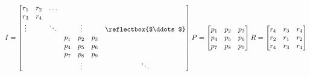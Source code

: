 \documentclass{article}
\begin{document}
\begin{math}
  I =
  \begin{bmatrix}
    r_1 & r_2 & \hdots & & & &\\
    r_3 & r_4 &  & & & &\\
    \vdots & & \ddots & & \vdots & & \reflectbox{$\ddots$} \\
    & & & p_1 & p_2 & p_3 &\\
    & & & p_4 & p_5 & p_6 &\\
    & & & p_7 & p_8 & p_9 &\\
    & & & & \vdots & & \ddots
  \end{bmatrix} \\
  P = \begin{bmatrix}
  p_1 & p_2 & p_3\\
  p_4 & p_5 & p_6\\
  p_7 & p_8 & p_9
\end{bmatrix} \\
R = \begin{bmatrix}
r_4 & r_3 & r_4\\
r_2 & r_1 & r_2\\
r_4 & r_3 & r_4
\end{bmatrix}
\end{math}
\end{document}
